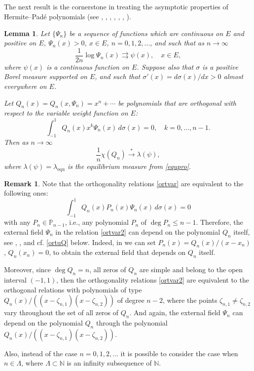 \documentclass[11pt, a4paper, twoside]{article}
\let\leq\leqslant
\def\NN{\mathbb N}
\def\PP{\mathbb P}
\def\mdeg{\operatorname{deg}}
\def\equ{\operatorname{equ}}
\theoremstyle{plain}
\newtheorem{lemma}{Lemma}
\theoremstyle{definition}
\newtheorem{remark}{Remark}
\begin{document}
\subsection{}\label{s2s2}
The next result is the cornerstone in treating the asymptotic properties of Hermite--Padé polynomials (see \cite{GoRa81}, \cite{GoRa87}, \cite{RaSu13}, \cite{Rak16}, \cite{Sue18}, \cite{Sue25b}, \cite{RaSu25}).

\begin{lemma}\label{lem2}
Let $\{\Psi_n\}$ be a sequence of functions which are continuous on $E$ and positive on $E$, $\Psi_n(x)>0$, $x\in E$, $n=0,1,2,\dots$, and such that  as $n\to\infty$
$$
\frac1{2n}\log\Psi_n(x)\rightrightarrows \psi(x),\quad x\in E,
$$
where $\psi(x)$ is a continuous function on  $E$.
Suppose also that $\sigma$ is a positive Borel measure supported on $E$,
and such that $\sigma'(x)=d\sigma(x)/dx>0$ almost everywhere on $E$. 

Let $Q_n(x)=Q_n(x,\Psi_n)=x^n+\dotsb$ be polynomials that are orthogonal with respect to the variable weight function on $E$:
\begin{equation}
\int_{-1}^1 Q_n(x)x^k\Psi_n(x)\,d\sigma(x)=0,
\quad k=0,\dots,n-1.
\label{ortvar}
\end{equation}
Then as $n\to\infty$
\begin{equation}
\frac1n\chi(Q_n)\overset{*}\longrightarrow\lambda(\psi),
\label{convar}
\end{equation}
where $\lambda(\psi)=\lambda_{\equ}$ is the equilibrium measure from \eqref{equpro}.
\end{lemma}

\begin{remark}\label{rem23}
Note that the orthogonality relations \eqref{ortvar} are equivalent to the following ones:
\begin{equation}
\int_{-1}^1 Q_n(x)P_{n}(x)\Psi_n(x)\,d\sigma(x)=0
\label{ortvar2}
\end{equation}
with any $P_n\in\PP_{n-1}$, i.e., any polynomial $P_n$ of $\mdeg{P_n}\leq{n-1}$. Therefore, the external field $\Psi_n$ in the relation \eqref{ortvar2} can depend on the polynomial $Q_n$ itself, see \cite[formula (119)]{RaSu13}, \cite[formula (41)]{Rak16}, \cite[Section 2.5]{Sue24} and cf. \eqref{ortuQ} below. 
Indeed, in \cite[formula (41)]{Rak16} we can set $P_n(x)=Q_n(x)/(x-x_n)$, $Q_n(x_n)=0$, to obtain the external field that depends on $Q_{n}$ itself. 

Moreover, since $\mdeg{Q_n}=n$, all zeros of $Q_n$ are simple and belong to the open interval $(-1,1)$, then  the orthogonality relations \eqref{ortvar2} are equivalent to the orthogonal relations with polynomials of type $Q_n(x)/((x-\zeta_{n,1})(x-\zeta_{n,2}))$ of degree $n-2$, where the points $\zeta_{n,1}\neq\zeta_{n,2}$ vary throughout the set of all zeros of $Q_n$. And again, the external field $\Psi_n$ can depend on the polynomial $Q_n$ through the polynomial $Q_n(x)/((x-\zeta_{n,1})(x-\zeta_{n,2}))$.

Also, instead of the case $n=0,1,2,\dots$ it is possible to consider the case when $n\in\Lambda$, where $\Lambda\subset\NN$ is an infinity subsequence of $\NN$. 
\end{remark}
\end{document}
